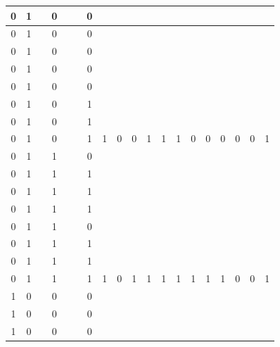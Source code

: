 \begin{table}[!tb]
\begin{tabular}{|c|c|c|c|c|c|c|c|c|c|c|c|c|c|c|c|c|c|c|}
        \rowcolor{red!40} 0 & 1 &  & 0 &  &  & 0 &  &  &  &  &  &  &  &  &  &  &  &  \\ \hline
        \rowcolor{red!40} 0 & 1 &  & 0 &  &  & 0 &  &  &  &  &  &  &  &  &  &  &  &  \\ \hline
        \rowcolor{red!40} 0 & 1 &  & 0 &  &  & 0 &  &  &  &  &  &  &  &  &  &  &  &  \\ \hline
        \rowcolor{red!40} 0 & 1 &  & 0 &  &  & 0 &  &  &  &  &  &  &  &  &  &  &  &  \\ \hline
        \rowcolor{red!40} 0 & 1 &  & 0 &  &  & 0 &  &  &  &  &  &  &  &  &  &  &  &  \\ \hline
        \rowcolor{red!40} 0 & 1 &  & 0 &  &  & 1 &  &  &  &  &  &  &  &  &  &  &  &  \\ \hline
        \rowcolor{red!40} 0 & 1 &  & 0 &  &  & 1 &  &  &  &  &  &  &  &  &  &  &  &  \\ \hline
        \rowcolor{red!40} 0 & 1 &  & 0 &  &  & 1 & 1 & 0 & 0 & 1 & 1 & 1 & 0 & 0 & 0 & 0 & 0 & 1 \\ \hline
        \rowcolor{green!40} 0 & 1 &  & 1 &  &  & 0 &  &  &  &  &  &  &  &  &  &  &  &  \\ \hline
        \rowcolor{green!40} 0 & 1 &  & 1 &  &  & 1 &  &  &  &  &  &  &  &  &  &  &  &  \\ \hline
        \rowcolor{green!40} 0 & 1 &  & 1 &  &  & 1 &  &  &  &  &  &  &  &  &  &  &  &  \\ \hline
        \rowcolor{green!40} 0 & 1 &  & 1 &  &  & 1 &  &  &  &  &  &  &  &  &  &  &  &  \\ \hline
        \rowcolor{green!40} 0 & 1 &  & 1 &  &  & 0 &  &  &  &  &  &  &  &  &  &  &  &  \\ \hline
        \rowcolor{green!40} 0 & 1 &  & 1 &  &  & 1 &  &  &  &  &  &  &  &  &  &  &  &  \\ \hline
        \rowcolor{green!40} 0 & 1 &  & 1 &  &  & 1 &  &  &  &  &  &  &  &  &  &  &  &  \\ \hline
        \rowcolor{green!40} 0 & 1 &  & 1 &  &  & 1 & 1 & 0 & 1 & 1 & 1 & 1 & 1 & 1 & 1 & 0 & 0 & 1 \\ \hline
        \rowcolor{yellow!40} 1 & 0 &  & 0 &  &  & 0 &  &  &  &  &  &  &  &  &  &  &  &  \\ \hline
        \rowcolor{yellow!40} 1 & 0 &  & 0 &  &  & 0 &  &  &  &  &  &  &  &  &  &  &  &  \\ \hline
        \rowcolor{yellow!40} 1 & 0 &  & 0 &  &  & 0 &  &  &  &  &  &  &  &  &  &  &  &  \\ \hline

\end{tabular}
\end{table}
